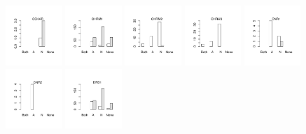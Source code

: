 \documentclass[utf8]{frontiersSCNS} %
\begin{document}
\begin{figure}[h!]
\includegraphics[width=0.19\textwidth]{figures/validation_plots/cckar_0p9_valplot.pdf}
\includegraphics[width=0.19\textwidth]{figures/validation_plots/chrm1_0p9_valplot.pdf}
\includegraphics[width=0.19\textwidth]{figures/validation_plots/chrm2_0p9_valplot.pdf}
\includegraphics[width=0.19\textwidth]{figures/validation_plots/chrm3_0p9_valplot.pdf}
\vspace*{-15pt} %
\includegraphics[width=0.19\textwidth]{figures/validation_plots/cnr1_0p9_valplot.pdf}
\includegraphics[width=0.19\textwidth]{figures/validation_plots/cnr2_0p9_valplot.pdf}
\includegraphics[width=0.19\textwidth]{figures/validation_plots/drd1_0p9_valplot.pdf}

\end{figure}
\end{document}
